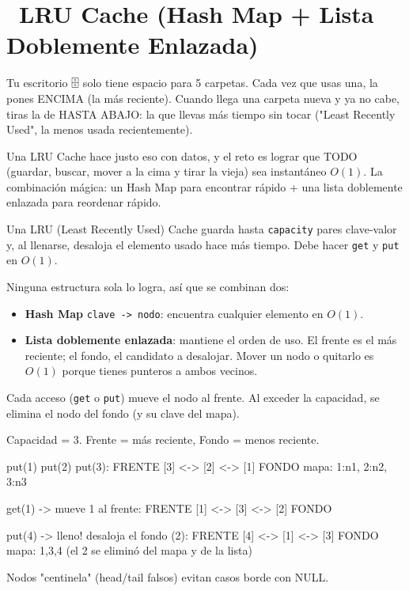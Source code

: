 \chapter[\emj{🧠}~LRU Cache (Hash Map + Lista Doble)]{~LRU Cache (Hash Map + Lista Doblemente Enlazada)}

\begin{dsaquees}

Tu escritorio 🗄️ solo tiene espacio para 5 carpetas. Cada vez que usas
una, la pones ENCIMA (la más reciente). Cuando llega una carpeta nueva y
ya no cabe, tiras la de HASTA ABAJO: la que llevas más tiempo sin tocar
("Least Recently Used", la menos usada recientemente).

Una LRU Cache hace justo eso con datos, y el reto es lograr que TODO
(guardar, buscar, mover a la cima y tirar la vieja) sea instantáneo
$O(1)$. La combinación mágica: un Hash Map para encontrar rápido + una
lista doblemente enlazada para reordenar rápido.

\end{dsaquees}

\begin{dsaotraforma}

Una LRU (Least Recently Used) Cache guarda hasta \verb|capacity| pares
clave-valor y, al llenarse, desaloja el elemento usado hace más tiempo.
Debe hacer \verb|get| y \verb|put| en $O(1)$.

Ninguna estructura sola lo logra, así que se combinan dos:
\begin{itemize}
\item \textbf{Hash Map} \verb|clave -> nodo|: encuentra cualquier
      elemento en $O(1)$.
\item \textbf{Lista doblemente enlazada}: mantiene el orden de uso. El
      frente es el más reciente; el fondo, el candidato a desalojar.
      Mover un nodo o quitarlo es $O(1)$ porque tienes punteros a ambos
      vecinos.
\end{itemize}

Cada acceso (\verb|get| o \verb|put|) mueve el nodo al frente. Al exceder
la capacidad, se elimina el nodo del fondo (y su clave del mapa).

\end{dsaotraforma}

\begin{dsadiagrama}
Capacidad = 3.  Frente = más reciente,  Fondo = menos reciente.

put(1) put(2) put(3):
  FRENTE [3] <-> [2] <-> [1] FONDO
  mapa: {1:n1, 2:n2, 3:n3}

get(1)  -> mueve 1 al frente:
  FRENTE [1] <-> [3] <-> [2] FONDO

put(4)  -> lleno! desaloja el fondo (2):
  FRENTE [4] <-> [1] <-> [3] FONDO
  mapa: {1,3,4}   (el 2 se eliminó del mapa y de la lista)

Nodos "centinela" (head/tail falsos) evitan casos borde con NULL.
\end{dsadiagrama}

